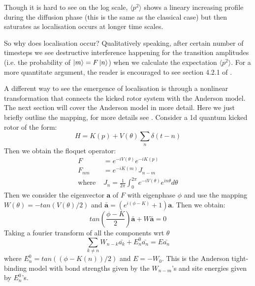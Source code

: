 \documentclass[twocolumn,nobalancelastpage]{report}
\begin{document}
Though it is hard to see on the log scale, $\langle p^2 \rangle$ shows a
lineary increasing profile during the diffusion phase (this is the same as
the classical case) but then saturates as localisation occurs at longer time
scales.

So why does localisation occur? Qualitatively speaking, after certain
number of timesteps we see destructive interference happening for
the transition amplitudes (i.e. the probability of $\ket{m} = F\ket{n}$)
when we calculate the expectation $\langle p^2 \rangle$. For a more
quantitate argument, the reader is encouraged to see section 4.2.1 of
\cite{stockmann}.

A different way to see the emergence of localisation is through a nonlinear
transformation that connects the kicked rotor system with the Anderson model.
The next section will cover the Anderson model in more detail. Here we just
briefly outline the mapping, for more details see \cite{stockmann}.
Consider a 1d quantum kicked rotor of the form:
\begin{equation}
    H = K(p) + V(\theta)\sum_{n} \delta(t - n)
\end{equation}
Then we obtain the floquet operator:
\begin{align}
    F &= e^{-iV(\theta)} e^{-iK(p)} \\
    F_{nm} &= e^{-iK(m)} J_{n-m} \\
    \text{where } & J_n = \frac{1}{2\pi} \int_0^{2\pi} e^{-iV(\theta)}
    e^{in\theta} d\theta
\end{align}
Then we consider the eigenvector $\mathbf{a}$ of $F$ with eigenphase $\phi$
and use the mapping $W(\theta) = -tan(V(\theta) / 2)$ and $\bar{\mathbf{a}}
= (e^{i(\phi - K)} + 1)\mathbf{a}$. Then we obtain:
\begin{equation}
    tan\left(\frac{\phi - K}{2}\right) \bar{\mathbf{a}} + W\bar{\mathbf{a}} = 0
\end{equation}
Taking a fourier transform of all the components wrt $\theta$
\begin{equation}
    \sum_{k \neq n} W_{n-k} \bar{a_k} + E^0_n \bar{a_n} = E \bar{a_n}
\end{equation}
where $E_n^0 = tan((\phi - K(n)) / 2)$ and $E = -W_0$. This is the Anderson
tight-binding model with bond strengths given by the $W_{n-m}$'s and site
energies given by $E^0_n$'s.
\end{document}
